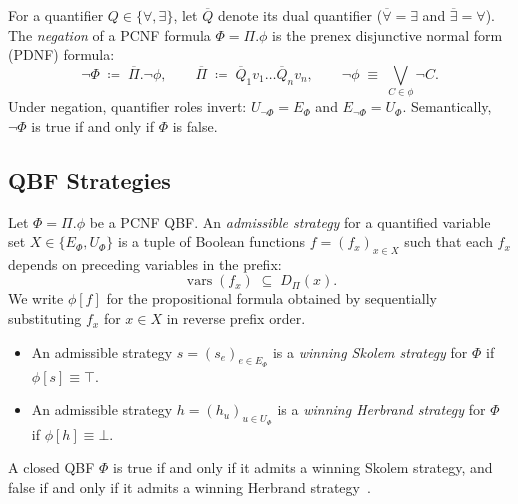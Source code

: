 \documentclass[runningheads]{llncs}
\DeclareMathOperator{\vars}{vars}
\begin{document}
For a quantifier $Q \in \{\forall, \exists\}$, let $\overline{Q}$ denote its dual quantifier ($\overline{\forall} = \exists$ and $\overline{\exists} = \forall$).
The \emph{negation} of a PCNF formula $\Phi = \Pi.\phi$ is the prenex disjunctive normal form (PDNF) formula:
\begin{equation}
    \neg\Phi \;\coloneqq\; \overline{\Pi}.\neg\phi ,
    \qquad \overline{\Pi} \;\coloneqq\; \overline{Q}_1 v_1 \dots \overline{Q}_n v_n ,
    \qquad \neg\phi \;\equiv\; \bigvee_{C \in \phi} \neg C .
\end{equation}
Under negation, quantifier roles invert: $U_{\neg\Phi} = E_\Phi$ and $E_{\neg\Phi} = U_\Phi$.
Semantically, $\neg\Phi$ is true if and only if $\Phi$ is false.


\subsection{QBF Strategies}
\label{subsec:strategies}


\begin{definition}[Strategies]
    \label{def:strategies}
    Let $\Phi = \Pi.\phi$ be a PCNF QBF.
    An \emph{admissible strategy} for a quantified variable set $X \in \{E_\Phi, U_\Phi\}$ is a tuple of Boolean functions $f = (f_x)_{x \in X}$ such that each $f_x$ depends on preceding variables in the prefix:
    \begin{equation}
        \vars(f_x) \;\subseteq\; D_\Pi(x) .
    \end{equation}
    We write $\phi[f]$ for the propositional formula obtained by sequentially substituting $f_x$ for $x \in X$ in reverse prefix order.
    \begin{itemize}
        \item An admissible strategy $s = (s_e)_{e \in E_\Phi}$ is a \emph{winning Skolem strategy} for $\Phi$ if $\phi[s] \equiv \top$.
        \item An admissible strategy $h = (h_u)_{u \in U_\Phi}$ is a \emph{winning Herbrand strategy} for $\Phi$ if $\phi[h] \equiv \bot$.
    \end{itemize}
\end{definition}

A closed QBF $\Phi$ is true if and only if it admits a winning Skolem strategy, and false if and only if it admits a winning Herbrand strategy~\cite{beyersdorff2021qbf}.
\end{document}
